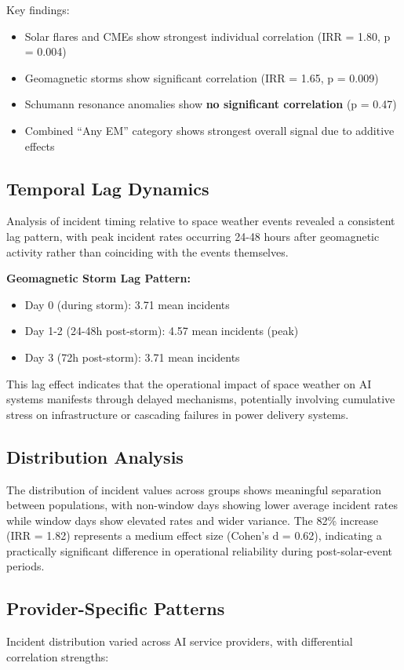 \documentclass[11pt,a4paper]{article}
\begin{document}
Key findings:
\begin{itemize}
\item Solar flares and CMEs show strongest individual correlation (IRR = 1.80, p = 0.004)
\item Geomagnetic storms show significant correlation (IRR = 1.65, p = 0.009)
\item Schumann resonance anomalies show \textbf{no significant correlation} (p = 0.47)
\item Combined ``Any EM'' category shows strongest overall signal due to additive effects
\end{itemize}

\subsection{Temporal Lag Dynamics}
Analysis of incident timing relative to space weather events revealed a consistent lag pattern, with peak incident rates occurring 24-48 hours after geomagnetic activity rather than coinciding with the events themselves.

\textbf{Geomagnetic Storm Lag Pattern:}
\begin{itemize}
\item Day 0 (during storm): 3.71 mean incidents
\item Day 1-2 (24-48h post-storm): 4.57 mean incidents (peak)
\item Day 3 (72h post-storm): 3.71 mean incidents
\end{itemize}

This lag effect indicates that the operational impact of space weather on AI systems manifests through delayed mechanisms, potentially involving cumulative stress on infrastructure or cascading failures in power delivery systems.

\subsection{Distribution Analysis}
The distribution of incident values across groups shows meaningful separation between populations, with non-window days showing lower average incident rates while window days show elevated rates and wider variance. The 82\% increase (IRR = 1.82) represents a medium effect size (Cohen's d = 0.62), indicating a practically significant difference in operational reliability during post-solar-event periods.

\subsection{Provider-Specific Patterns}
Incident distribution varied across AI service providers, with differential correlation strengths:
\end{document}

